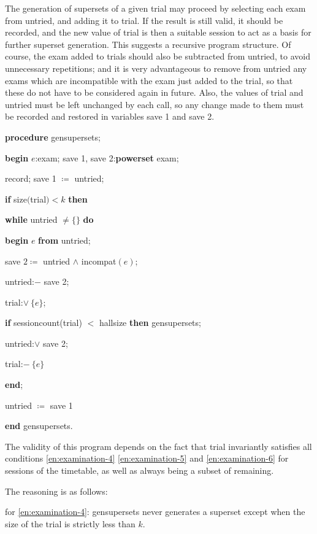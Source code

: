 The generation of supersets of a given trial may proceed by selecting each exam from untried, and adding it to trial. If the result is still valid, it should be recorded, and the new value of trial is then a suitable session to act as a basis for further superset generation. This suggests a recursive program structure. Of course, the exam added to trials should also be subtracted from untried, to avoid unnecessary repetitions; and it is very advantageous to remove from untried any exams which are incompatible with the exam just added to the trial, so that these do not have to be considered again in future. Also, the values of trial and untried must be left unchanged by each call, so any change made to them must be recorded and restored in variables save 1 and save 2.

\textbf{procedure} gensupersets;

\quad \textbf{begin} $e$:exam; save 1, save 2:\textbf{powerset} exam;

\quad \quad record; save 1 $\coloneq$ untried;

\quad \quad \textbf{if} size$($trial$) < k$ \textbf{then}

\quad \quad \textbf{while} untried $\neq \{\}$ \textbf{do}

\quad \quad \quad \textbf{begin} $e$ \textbf{from} untried;

\quad \quad \quad \quad save $2\coloneq$ untried $\wedge$ incompat$(e)$;

\quad \quad \quad \quad untried:$-$ save 2;

\quad \quad \quad \quad trial:$\vee\ \{e\}$;

\quad \quad \quad \quad \textbf{if} sessioncount(trial) $<$ hallsize \textbf{then} gensupersets;

\quad \quad \quad \quad untried:$\vee$ save 2;

\quad \quad \quad \quad trial:$-\ \{e\}$

\quad \quad \quad \textbf{end};

\quad \quad \quad untried $\coloneq$ save 1

\quad \textbf{end} gensupersets.

The validity of this program depends on the fact that trial invariantly satisfies all conditions \ref{en:examination-4} \ref{en:examination-5} and \ref{en:examination-6} for sessions of the timetable, as well as always being a subset of remaining.

The reasoning is as follows:

for \ref{en:examination-4}: gensupersets never generates a superset except when the size of the trial is strictly less than $k$.

